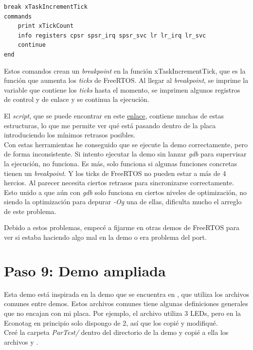 \begin{verbatim}
break xTaskIncrementTick
commands
    print xTickCount
    info registers cpsr spsr_irq spsr_svc lr lr_irq lr_svc
    continue
end
\end{verbatim}

Estos comandos crean un \emph{breakpoint} en la función xTaskIncrementTick, que es la función que aumenta los \emph{ticks} de FreeRTOS. Al llegar al \emph{breakpoint}, se imprime la variable que contiene los \emph{ticks} hasta el momento, se imprimen algunos registros de control y de enlace y se continua la ejecución.

El \emph{script}, que se puede encontrar en este \href{https://github.com/epaubert/FreeRTOS-TFG/blob/main/FreeRTOS/Demo/ARM7_MC13224V_GCC/break.gdb}{enlace}, contiene muchas de estas estructuras, lo que me permite ver qué está pasando dentro de la placa introduciendo los mínimos retrasos posibles.\\

Con estas herramientas he conseguido que se ejecute la demo correctamente, pero de forma inconsistente. Si intento ejecutar la demo sin lanzar \emph{gdb} para supervisar la ejecución, no funciona. Es más, solo funciona si algunas funciones concretas tienen un \emph{breakpoint}. Y los ticks de FreeRTOS no pueden estar a más de 4 hercios. Al parecer necesita ciertos retrasos para sincronizarse correctamente. Esto unido a que aún con \emph{gdb} solo funciona en ciertos niveles de optimización, no siendo la optimización para depurar \emph{-Og} una de ellas, dificulta mucho el arreglo de este problema. 

Debido a estos problemas, empecé a fijarme en otras demos de FreeRTOS para ver si estaba haciendo algo mal en la demo o era problema del port.

\section{Paso 9: Demo ampliada}
Esta demo está inspirada en la demo que se encuentra en , que utiliza los archivos comunes entre demos. Estos archivos comunes tiene algunas definiciones generales que no encajan con mi placa. Por ejemplo, el archivo  utiliza 3 LEDs, pero en la Econotag en principio solo dispongo de 2, así que los copié y modifiqué.\\

Creé la carpeta \emph{ParTest/} dentro del directorio de la demo y copié a ella los archivos  y .

